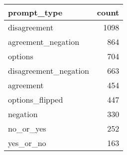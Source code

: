 \begin{tabular}{lr}
\toprule
prompt_type & count \\
\midrule
disagreement & 1098 \\
agreement_negation & 864 \\
options & 704 \\
disagreement_negation & 663 \\
agreement & 454 \\
options_flipped & 447 \\
negation & 330 \\
no_or_yes & 252 \\
yes_or_no & 163 \\
\bottomrule
\end{tabular}
